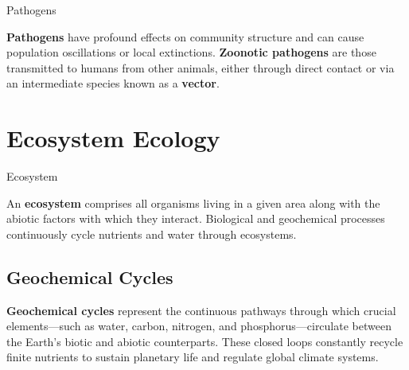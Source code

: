 \documentclass[10pt]{article}
\begin{document}
    \begin{core}[label=core:pathogen]{Pathogens}

      \textbf{Pathogens} have profound effects on community structure and can cause population oscillations or local extinctions. \textbf{Zoonotic pathogens} are those transmitted to humans from other animals, either through direct contact or via an intermediate species known as a \textbf{vector}.

    \end{core}

\section{Ecosystem Ecology}

  \begin{core}{Ecosystem}

    An \textbf{ecosystem} comprises all organisms living in a given area along with the abiotic factors with which they interact. Biological and geochemical processes continuously cycle nutrients and water through ecosystems.

  \end{core}

  \subsection{Geochemical Cycles}

    \textbf{Geochemical cycles} represent the continuous pathways through which crucial elements---such as water, carbon, nitrogen, and phosphorus---circulate between the Earth's biotic and abiotic counterparts. These closed loops constantly recycle finite nutrients to sustain planetary life and regulate global climate systems.
\end{document}
